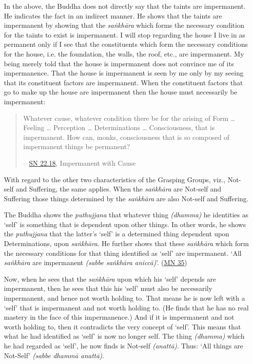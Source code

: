 In the above, the Buddha does not directly say that the taints are impermanent. He indicates the fact in an indirect manner. He shows that the taints are impermanent by showing that the \emph{saṅkhāra} which forms the necessary condition for the taints to exist is impermanent. I will stop regarding the house I live in as permanent only if I see that the constituents which form the necessary conditions for the house, i.e. the foundation, the walls, the roof, etc., are impermanent. My being merely told that the house is impermanent does not convince me of its impermanence. That the house is impermanent is seen by me only by my seeing that its constituent factors are impermanent. When the constituent factors that go to make up the house are impermanent then the house must necessarily be impermanent:

\begin{quote}
Whatever cause, whatever condition there be for the arising of Form \ldots\hspace{0pt} Feeling \ldots\hspace{0pt} Perception \ldots\hspace{0pt} Determinations \ldots\hspace{0pt} Consciousness, that is impermanent. How can, monks, consciousness that is so composed of impermanent things be permanent?

 -- \href{https://suttacentral.net/sn22.18/en/bodhi}{SN 22.18}, Impermanent with Cause
\end{quote}

With regard to the other two characteristics of the Grasping Groups, viz., Not-self and Suffering, the same applies. When the \emph{saṅkhāra} are Not-self and Suffering those things determined by the \emph{saṅkhāra} are also Not-self and Suffering.

The Buddha shows the \emph{puthujjana} that whatever thing \emph{(dhamma)} he identities as `self' is something that is dependent upon other things. In other words, he shows the \emph{puthujjana} that the latter's `self' is a determined thing dependent upon Determinations, upon \emph{saṅkhāra}. He further shows that these \emph{saṅkhāra} which form the necessary conditions for that thing identified as `self' are impermanent. `All \emph{sañkhāra} are impermanent \emph{(sabbe saṅkhāra aniccā)}'. (\href{https://suttacentral.net/mn35/en/sujato}{MN 35})

Now, when he sees that the \emph{saṅkhāra} upon which his `self' depends are impermanent, then he sees that this his `self' must also be necessarily impermanent, and hence not worth holding to. That means he is now left with a `self' that is impermanent and not worth holding to. (He finds that he has no real mastery in the face of this impermanence.) And if it is impermanent and not worth holding to, then it contradicts the very concept of `self'. This means that what he had identified as `self' is now no longer self. The thing \emph{(dhamma)} which he had regarded as `self', he now finds is Not-self \emph{(anattā)}. Thus: `All things are Not-Self' \emph{(sabbe dhammā anattā)}.

